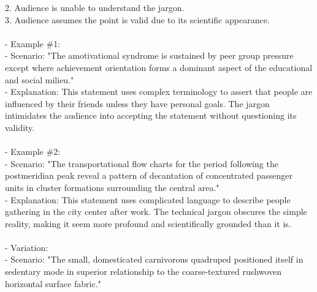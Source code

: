 \documentclass[a4paper,12pt,single,pdftex]{scrbook}
\begin{document}
    
        2. Audience is unable to understand the jargon.
    \\

    
        3. Audience assumes the point is valid due to its scientific appearance.
    \\

    
      
    \\

    
      - Example \#1:
    \\

    
        - Scenario: "The amotivational syndrome is sustained by peer group pressure except where achievement orientation forms a dominant aspect of the educational and social milieu."
    \\

    
        - Explanation: This statement uses complex terminology to assert that people are influenced by their friends unless they have personal goals. The jargon intimidates the audience into accepting the statement without questioning its validity.
    \\

    
      
    \\

    
      - Example \#2:
    \\

    
        - Scenario: "The transportational flow charts for the period following the postmeridian peak reveal a pattern of decantation of concentrated passenger units in cluster formations surrounding the central area."
    \\

    
        - Explanation: This statement uses complicated language to describe people gathering in the city center after work. The technical jargon obscures the simple reality, making it seem more profound and scientifically grounded than it is.
    \\

    
      
    \\

    
      - Variation:
    \\

    
        - Scenario: "The small, domesticated carnivorous quadruped positioned itself in sedentary mode in superior relationship to the coarse-textured rushwoven horizontal surface fabric."
    \\
\end{document}
